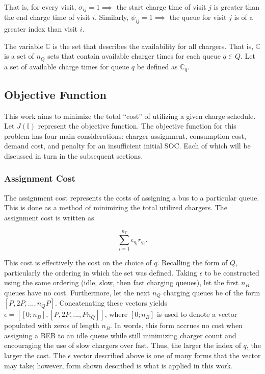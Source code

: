 \documentclass[energies,article,submit,moreauthors]{Definitions/mdpi}
\newcommand{\I}{\mathbb{I}}                 %
\newcommand{\C}{\mathbb{C}}                 %
\begin{document}
That is, for every visit, \(\sigma_{ij} = 1 \implies\) the start charge time of visit \(j\) is greater than the end charge time
of visit \(i\). Similarly, \(\psi_{ij} = 1 \implies\) the queue for visit \(j\) is of a greater index than visit \(i\).

The variable \(\C\) is the set that describes the availability for all chargers. That is, \(\C\) is a set of \(n_Q\) sets that
contain available charger times for each queue \(q \in Q\). Let a set of available charge times for queue \(q\) be defined as
\(\C_q\).

\subsection{Objective Function}
\label{sec:objective-function}
This work aims to minimize the total ``cost'' of utilizing a given charge schedule. Let \(J(\I)\) represent the objective
function. The objective function for this problem has four main considerations: charger assignment, consumption cost,
demand cost, and penalty for an insufficient initial SOC. Each of which will be discussed in turn in the subsequent
sections.

\subsubsection{Assignment Cost}
\label{sec:assignment-cost}
The assignment cost represents the costs of assigning a bus to a particular queue. This is done as a method of
minimizing the total utilized chargers. The assignment cost is written as

\begin{equation}
\label{eq:assignment-cost}
\sum_{i=1}^{n_V} \epsilon_{q_i}r_{q_i}\text{.}
\end{equation}

This cost is effectively the cost on the choice of \(q\). Recalling the form of \(Q\), particularly the ordering in which
the set was defined. Taking \(\epsilon\) to be constructed using the same ordering (idle, slow, then fast charging queues), let
the first \(n_B\) queues have no cost. Furthermore, let the next \(n_Q\) charging queues be of the form \([P, 2P, ...,
n_QP]\). Concatenating these vectors yields \(\epsilon = [[0; n_B], [P, 2P, ..., Pn_Q]]\), where \([0; n_B]\) is used to denote a
vector populated with zeros of length \(n_B\). In words, this form accrues no cost when assigning a BEB to an idle queue
while still minimizing charger count and encouraging the use of slow chargers over fast. Thus, the larger the index of
\(q\), the larger the cost. The \(\epsilon\) vector described above is one of many forms that the vector may take; however, form
shown described is what is applied in this work.
\end{document}
